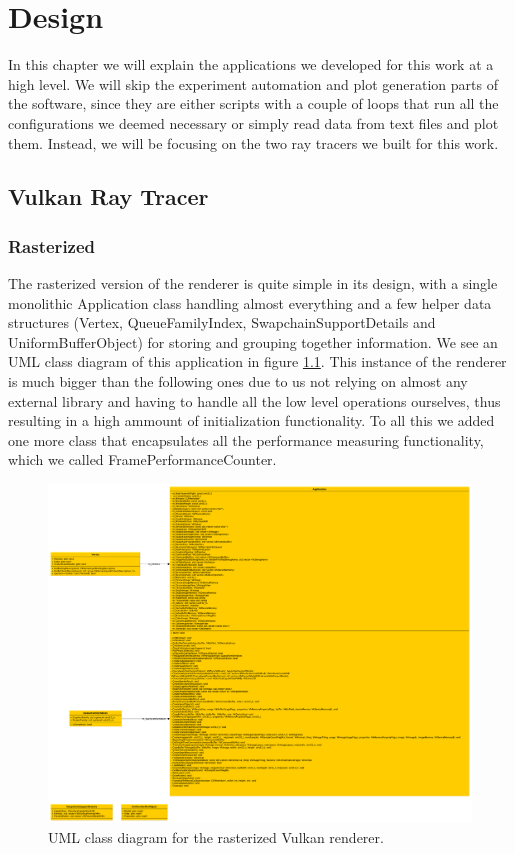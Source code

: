 \chapter{Design}
In this chapter we will explain the applications we developed for this work at a high level. We will skip the experiment automation and plot generation parts of the software, since they are either scripts with a couple of loops that run all the configurations we deemed necessary or simply read data from text files and plot them. Instead, we will be focusing on the two ray tracers we built for this work.

\section{Vulkan Ray Tracer}
\subsection{Rasterized}
The rasterized version of the renderer is quite simple in its design, with a single monolithic Application class handling almost everything and a few helper data structures (Vertex, QueueFamilyIndex, SwapchainSupportDetails and UniformBufferObject) for storing and grouping together information. We see an UML class diagram of this application in figure \ref{rasterized-uml}. This instance of the renderer is much bigger than the following ones due to us not relying on almost any external library and having to handle all the low level operations ourselves, thus resulting in a high ammount of initialization functionality. To all this we added one more class that encapsulates all the performance measuring functionality, which we called FramePerformanceCounter.

\begin{figure}[hbt!]
  \centering
  \includegraphics[width=\textwidth]{figuras/rasterized-uml.png}
  \caption{UML class diagram for the rasterized Vulkan renderer.}
  \label{rasterized-uml}
\end{figure}

